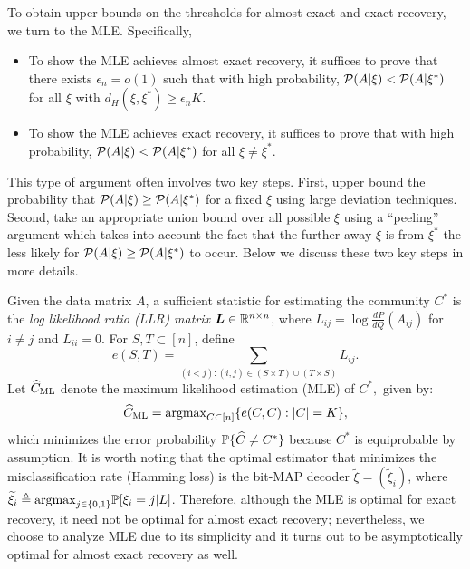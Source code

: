 To obtain upper bounds on the thresholds for almost exact and exact recovery, we
turn to the MLE. 
Specifically,
\begin{itemize}
	\item To show the MLE achieves almost exact recovery, it suffices to prove that 
there exists $\epsilon_n=o(1)$ such that with high probability, 
$\P(A| \xi) < \P (A |\xi^*)$  for all $\xi$ with $d_H( \xi, \xi^*) \ge \epsilon_n K $. 
\item To show the MLE achieves exact recovery, it suffices to prove that
with high probability, $\P(A | \xi) < \P(A | \xi^*)$ for all $\xi \neq \xi^*$. 
\end{itemize}
This type of argument often involves two key steps. First, upper bound the probability that $\P(A| \xi) \ge \P (A |\xi^*)$ for a fixed 
$\xi$ using large deviation techniques. Second, take an appropriate union bound over all possible $\xi$ using a ``peeling'' argument which takes into account the fact that the further away $\xi$ is from $\xi^*$ the less likely for $\P(A| \xi) \ge \P (A |\xi^*)$ to occur. 
Below we discuss these two key steps in more details.



Given the data matrix $A$, a sufficient statistic for estimating the community $C^*$ is
the \emph{log likelihood ratio (LLR) matrix} $\bm{L} \in \reals^{n \times n}$, where
$L_{ij}=\log \frac{dP}{dQ}(A_{ij})$ for $i \neq j$ and $L_{ii}=0$.
For $S,T\subset [n]$,  define  
\begin{equation}
e(S,T) = \sum_{(i<j): (i,j) \in (S\times T) \cup (T\times S)} L_{ij}.
	\label{eq:eST}
\end{equation}
Let $\CML$ denote the maximum likelihood estimation (MLE) of $C^*,$ given by:
\begin{equation}
\CML=\argmax_{C\subset [n]} \{ e(C,C) : |C|= K \},
	\label{eq:MLE}
\end{equation}
which minimizes the error probability $\pprob{\widehat{C}\neq C^*}$ because $C^*$ is equiprobable by assumption.
It is worth noting that the optimal estimator that minimizes the misclassification rate (Hamming loss) is the bit-MAP decoder $\tilde\xi=(\tilde\xi_i)$, where 
$\tilde \xi_i \triangleq \argmax_{j\in\{0,1\}} \Prob[\xi_i=j|L]$. Therefore, although
the MLE is optimal for exact recovery, it need not be optimal for almost exact recovery;
nevertheless, we choose to analyze MLE due to its simplicity and it turns out to
be asymptotically optimal for almost exact recovery as well.

